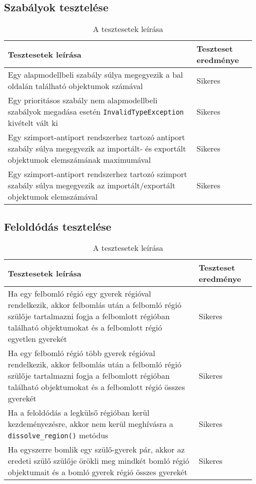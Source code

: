 \subsection{Szabályok tesztelése}


\begin{table}[H]
	\centering
	\begin{tabular}{ | m{} | m{} | }
		\hline
		\textbf{Tesztesetek leírása} & \textbf{Teszteset eredménye} \\
		\hline \hline
		Egy alapmodellbeli szabály súlya megegyezik a bal oldalán található objektumok számával & Sikeres \\
		\hline
		
	  Egy prioritásos szabály nem alapmodellbeli szabályok megadása esetén \verb|InvalidTypeException| kivételt vált ki & Sikeres \\
		\hline
		
				Egy szimport-antiport rendszerhez tartozó antiport szabály súlya megegyezik az importált- és exportált objektumok elemszámának maximumával & Sikeres \\
		\hline
		
						Egy szimport-antiport rendszerhez tartozó szimport szabály súlya megegyezik az importált/exportált objektumok elemszámával & Sikeres \\
		\hline
	\end{tabular}
	\caption{A tesztesetek leírása}
	\label{tab:test_cases_rules}
\end{table}

\subsection{Feloldódás tesztelése}

\begin{table}[H]
	\centering
	\begin{tabular}{ | m{} | m{} | }
		\hline
		\textbf{Tesztesetek leírása} & \textbf{Teszteset eredménye} \\
		\hline \hline
		Ha egy felbomló régió egy gyerek régióval rendelkezik, akkor felbomlás után a felbomló régió szülője tartalmazni fogja a felbomlott régióban található objektumokat és a felbomlott régió egyetlen gyerekét & Sikeres \\
		\hline
		Ha egy felbomló régió több gyerek régióval rendelkezik, akkor felbomlás után a felbomló régió szülője tartalmazni fogja a felbomlott régióban található objektumokat és a felbomlott régió összes gyerekét & Sikeres \\
		\hline
		Ha a feloldódás a legkülső régióban kerül kezdeményezésre, akkor nem kerül meghívásra a \verb|dissolve_region()| metódus & Sikeres \\
		\hline
		
		Ha egyszerre bomlik egy szülő-gyerek pár, akkor az eredeti szülő szülője örökli meg mindkét bomló régió objektumait és a bomló gyerek régió összes gyerekét & Sikeres \\
		\hline
	\end{tabular}
	\caption{A tesztesetek leírása}
	\label{tab:test_cases_dissolve}
\end{table}

